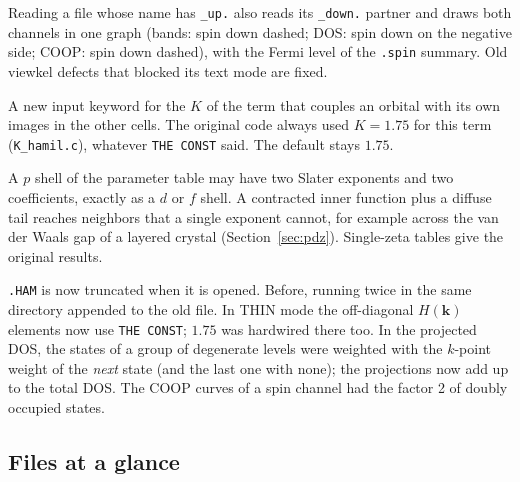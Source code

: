 \documentclass[11pt,a4paper]{article}
\newcommand{\file}[1]{\texttt{#1}}
\begin{document}
\begin{description}[style=nextline,leftmargin=1.2em]
\item[viewkel]
Reading a file whose name has \texttt{\_up.} also reads its \texttt{\_down.} partner and
draws both channels in one graph (bands: spin down dashed; DOS: spin down on the
negative side; COOP: spin down dashed), with the Fermi level of the \texttt{.spin}
summary. Old viewkel defects that blocked its text mode are fixed.

\item[\texttt{THE CONST DIAG}]
A new input keyword for the $K$ of the term that couples an orbital with its own images in
the other cells. The original code always used $K=1.75$ for this term
(\file{K\_hamil.c}), whatever \texttt{THE CONST} said. The default stays $1.75$.

\item[Double-zeta $p$ orbitals]
A $p$ shell of the parameter table may have two Slater exponents and two coefficients,
exactly as a $d$ or $f$ shell. A contracted inner function plus a diffuse tail reaches
neighbors that a single exponent cannot, for example across the van der Waals gap of a
layered crystal (Section~\ref{sec:pdz}). Single-zeta tables give the original results.

\item[Fixes]
\texttt{.HAM} is now truncated when it is opened. Before, running twice in the same
directory appended to the old file. In THIN mode the off-diagonal $H(\mathbf{k})$
elements now use \texttt{THE CONST}; $1.75$ was hardwired there too. In the projected
DOS, the states of a group of degenerate levels were weighted with the $k$-point weight
of the \emph{next} state (and the last one with none); the projections now add up to the
total DOS. The COOP curves of a spin channel had the factor 2 of doubly occupied states.
\end{description}

\subsection{Files at a glance}
\end{document}
